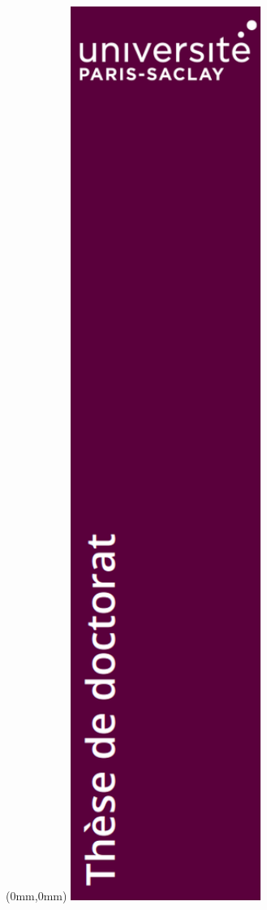 \documentclass[a4paper]{article}
\begin{document}
\begin{textblock*}{61mm}(0mm,0mm)
	\noindent\includegraphics[height=297mm]{images/image35}
\end{textblock*}
\end{document}
